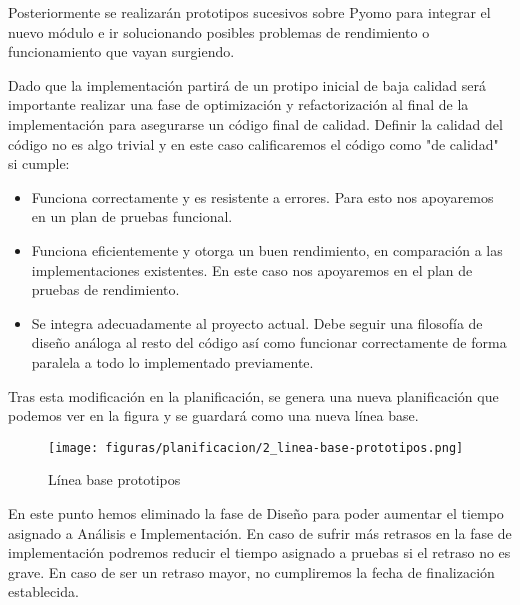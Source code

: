 Posteriormente se realizarán prototipos sucesivos sobre Pyomo para integrar el nuevo módulo e ir solucionando posibles problemas de rendimiento o funcionamiento que vayan surgiendo. 

Dado que la implementación partirá de un protipo inicial de baja calidad será importante realizar una fase de optimización y refactorización al final de la implementación para asegurarse un código final de calidad. Definir la calidad del código no es algo trivial y en este caso calificaremos el código como "de calidad" si cumple:

\begin{itemize}
    \item Funciona correctamente y es resistente a errores. Para esto nos apoyaremos en un plan de pruebas funcional.
    \item Funciona eficientemente y otorga un buen rendimiento, en comparación a las implementaciones existentes. En este caso nos apoyaremos en el plan de pruebas de rendimiento.
    \item Se integra adecuadamente al proyecto actual. Debe seguir una filosofía de diseño análoga al resto del código así como funcionar correctamente de forma paralela a todo lo implementado previamente.
\end{itemize}

Tras esta modificación en la planificación, se genera una nueva planificación que podemos ver en la figura y se guardará como una nueva línea base.%

\begin{figure}[H]
    \centerline{\texttt{[image: figuras/planificacion/2\_linea-base-prototipos.png]}}
    \caption{Línea base prototipos}
\end{figure}

En este punto hemos eliminado la fase de Diseño para poder aumentar el tiempo asignado a Análisis e Implementación. En caso de sufrir más retrasos en la fase de implementación podremos reducir el tiempo asignado a pruebas si el retraso no es grave. En caso de ser un retraso mayor, no cumpliremos la fecha de finalización establecida.


